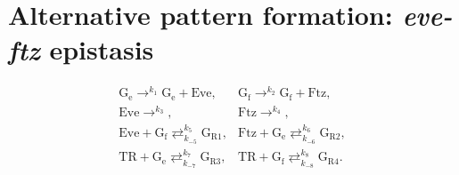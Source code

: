 \documentclass[final,authoryear, 5p, times]{elsarticle}
\begin{document}
\section{Alternative pattern formation: \textit{eve-ftz} epistasis}\label{AppB}

\begin{equation} \label{SEFsystemSup}
    \begin{array}{ll}\displaystyle 
    \text{G}_\text{e}  \mathop{\longrightarrow}^{k_{1}} \text{G}_\text{e} + \text{Eve}, & \displaystyle
    \text{G}_\text{f}  \mathop{\longrightarrow}^{k_{2}} \text{G}_\text{f} + \text{Ftz}, \\ \displaystyle
    \text{Eve} \mathop{\longrightarrow}^{k_{3}}, & \displaystyle
    \text{Ftz} \mathop{\longrightarrow}^{k_{4}}, \\ \displaystyle
    \text{Eve} + \text{G}_\text{f} \mathop{\rightleftarrows}^{k_{5}}_{k_{-5}} \text{G}_{\text{R1}}, & \displaystyle
    \text{Ftz} + \text{G}_\text{e} \mathop{\rightleftarrows}^{k_{6}}_{k_{-6}} \text{G}_{\text{R2}}, \\ \displaystyle
    \text{TR} + \text{G}_\text{e} \mathop{\rightleftarrows}^{k_{7}}_{k_{-7}} \text{G}_{\text{R3}}, & \displaystyle
    \text{TR} + \text{G}_\text{f} \mathop{\rightleftarrows}^{k_{8}}_{k_{-8}} \text{G}_{\text{R4}}.
\end{array}
\end{equation}
\end{document}
